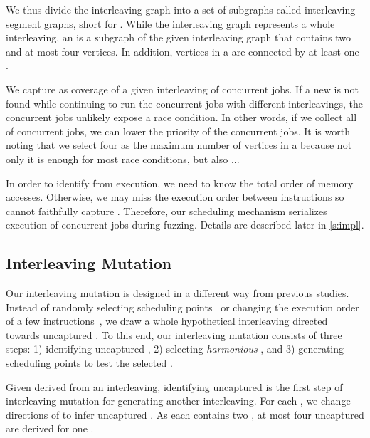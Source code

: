 %
We thus divide the interleaving graph into a set of subgraphs called
interleaving segment graphs, short for \segments.
%
While the interleaving graph represents a whole interleaving, an
\segment is a subgraph of the given interleaving graph that contains
two \mutables and at most four vertices. In addition, vertices in a
\segment are connected by at least one \mutable.

We capture \segments as coverage of a given interleaving of concurrent
jobs.
%
If a new \segment is not found while continuing to run the concurrent
jobs with different interleavings, the concurrent jobs unlikely expose
a race condition. In other words, if we collect all \segments of
concurrent jobs, we can lower the priority of the concurrent jobs.
%
It is worth noting that we select four as the maximum number of
vertices in a \segment because not only it is enough for most race
conditions, but also \dr{}...

In order to identify \segments from execution, we need to know the
total order of memory accesses. Otherwise, we may miss the execution
order between instructions so cannot faithfully capture \segments.
%
Therefore, our scheduling mechanism serializes execution of concurrent
jobs during fuzzing. Details are described later in \autoref{s:impl}.


\subsection{Interleaving Mutation}
\label{ss:scheduler}


Our interleaving mutation is designed in a different way from previous
studies.
% 
Instead of randomly selecting scheduling points~\cite{krace, ski} or
changing the execution order of a few instructions~\cite{razzer,
  snowboard}, we draw a whole hypothetical interleaving directed
towards uncaptured \segments.
%
To this end, our interleaving mutation consists of three steps:
%
1) identifying uncaptured \segments, 2) selecting \textit{harmonious}
\segments, and 3) generating scheduling points to test the selected
\segments.

%
Given \segments derived from an interleaving, identifying uncaptured
\segments is the first step of interleaving mutation for generating
another interleaving.
%
For each \segment, we change directions of \mutables to infer
uncaptured \segments.
%
As each \segment contains two \mutables, at most four uncaptured
\segments are derived for one \segment.

